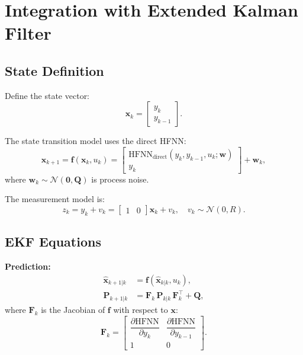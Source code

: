 \documentclass[lettersize,journal]{IEEEtran}
\begin{document}
\section{Integration with Extended Kalman Filter}
\label{sec:ekf}

\subsection{State Definition}

Define the state vector:
\begin{equation}
\label{eq:state}
\mathbf{x}_k = \begin{bmatrix} y_k \\ y_{k-1} \end{bmatrix}.
\end{equation}

The state transition model uses the direct HFNN:
\begin{equation}
\label{eq:transition}
\mathbf{x}_{k+1} = \mathbf{f}(\mathbf{x}_k, u_k) = \begin{bmatrix} \text{HFNN}_{\text{direct}}(y_k, y_{k-1}, u_k; \mathbf{w}) \\ y_k \end{bmatrix} + \mathbf{w}_k,
\end{equation}
where $\mathbf{w}_k \sim \mathcal{N}(\mathbf{0}, \mathbf{Q})$ is process noise.

The measurement model is:
\begin{equation}
\label{eq:measurement}
z_k = y_k + v_k = \begin{bmatrix} 1 & 0 \end{bmatrix} \mathbf{x}_k + v_k, \quad v_k \sim \mathcal{N}(0, R).
\end{equation}

\subsection{EKF Equations}

\textbf{Prediction:}
\begin{align}
\hat{\mathbf{x}}_{k+1|k} &= \mathbf{f}(\hat{\mathbf{x}}_{k|k}, u_k), \label{eq:ekf_pred_state} \\
\mathbf{P}_{k+1|k} &= \mathbf{F}_k \, \mathbf{P}_{k|k} \, \mathbf{F}_k^\top + \mathbf{Q}, \label{eq:ekf_pred_cov}
\end{align}
where $\mathbf{F}_k$ is the Jacobian of $\mathbf{f}$ with respect to $\mathbf{x}$:
\begin{equation}
\label{eq:jacobian_F}
\mathbf{F}_k = \begin{bmatrix} \dfrac{\partial \text{HFNN}}{\partial y_k} & \dfrac{\partial \text{HFNN}}{\partial y_{k-1}} \\[8pt] 1 & 0 \end{bmatrix}.
\end{equation}
\end{document}
